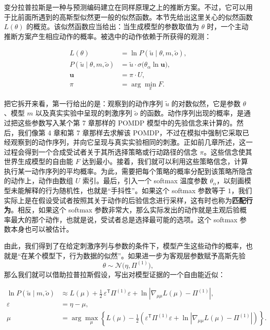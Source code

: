变分拉普拉斯是一种与预测编码建立在同样原理之上的推断方案。不过，它可以用于比前面所遇到的高斯型似然更一般的似然函数。本节先给出这里关心的似然函数 $L(\theta)$ 的概览。该似然函数应当给出：当生成模型的参数取值为 $\theta$ 时，一个主动推断方案产生相应动作的概率。被选中的动作依赖于所获得的观测：

\begin{equation}
\begin{aligned}
L(\theta) &= \ln P(\tilde{u}\mid \theta, m,\tilde{o}), \\
P(\tilde{u}\mid \theta,m,\tilde{o}) &= \tilde{u}\cdot \sigma\!\bigl(\theta_{\alpha}\ln \mathbf{u}\bigr), \\
\mathbf{u} &= \pi \cdot U, \\
\pi &= \arg\min_{\pi} F.
\end{aligned}
\label{eq:chapter9-likelihood}
\end{equation}

把它拆开来看，第一行给出的是：观察到的动作序列 $\tilde{u}$ 的对数似然，它是参数 $\theta$、模型 $m$ 以及真实实验中呈现的刺激序列 $\tilde{o}$ 的函数。动作序列出现的概率，是通过把这些参数写入某个第 7 章那样的 POMDP 模型中的先验信念来计算的。然后，我们像第 4 章和第 7 章那样去求解该 POMDP，不过在模拟中强制它采取已经观察到的动作序列，并向它呈现与真实实验相同的刺激。正如前几章所述，这一过程会得到一个合成受试者关于其所选择策略或行动路径的信念 $\pi$。这些信念使其世界生成模型的自由能 $F$ 达到最小。接着，我们就可以利用这些策略信念，计算执行某一动作序列的平均概率。为此，需要把每个策略的概率分配到该策略所隐含的动作上，动作由数组 $U$ 索引。最后，引入一个 softmax 温度参数 $\theta_{\alpha}$，以刻画模型未能解释的行为随机性，也就是“手抖性”。如果这个 softmax 参数等于 $1$，我们实际上是在假设受试者按照其关于动作的后验信念进行采样，这有时也称为\textbf{匹配行为}。相反，如果这个 softmax 参数非常大，那么实际发出的动作就是主观后验概率最大的那个动作，也就是说，受试者总是选择最可能的选项。这个 softmax 参数本身也可以被估计。

由此，我们得到了在给定刺激序列与参数的条件下，模型产生这些动作的概率，也就是“在某个模型下，行为数据的似然”。如果进一步为客观层参数赋予高斯先验
\[
\theta \sim \mathcal{N}\!\bigl(\eta,\Pi^{(1)}\bigr),
\]
那么我们就可以借助拉普拉斯假设，写出对模型证据的一个自由能近似：

\begin{equation}
\begin{aligned}
\ln P(\tilde{u}\mid m,\tilde{o})
&\approx L(\mu)+\frac{1}{2}\,\varepsilon^{\mathsf T}\Pi^{(1)}\varepsilon
+\ln \left|\nabla_{\mu\mu}L(\mu)-\Pi^{(1)}\right|, \\
\varepsilon &= \eta-\mu, \\
\mu &= \arg\max_{\mu}\left\{
L(\mu)-\frac{1}{2}\left(
\varepsilon^{\mathsf T}\Pi^{(1)}\varepsilon
+\ln \left|\nabla_{\mu\mu}L(\mu)-\Pi^{(1)}\right|
\right)\right\}.
\end{aligned}
\label{eq:chapter9-evidence}
\end{equation}

